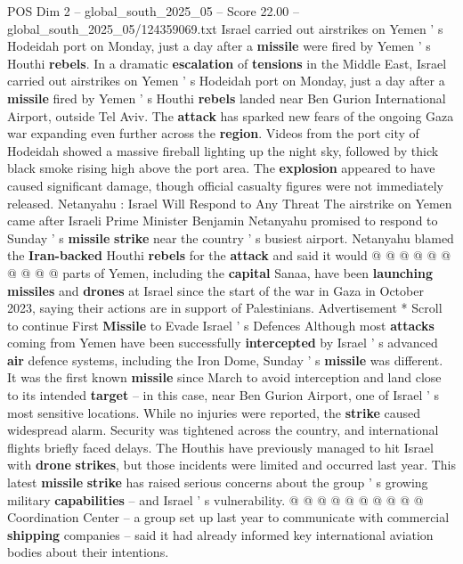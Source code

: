 \begin{textsample}{POS Dim 2 – global\_south\_2025\_05 – Score 22.00 – global\_south\_2025\_05/124359069.txt}  \label{ex:f2_pos_292}
Israel carried out airstrikes on Yemen ' s Hodeidah port on Monday, just a day after a \textbf{missile} were fired by Yemen ' s Houthi \textbf{rebels}.
In a dramatic \textbf{escalation} of \textbf{tensions} in the Middle East, Israel carried out airstrikes on Yemen ' s Hodeidah port on Monday, just a day after a \textbf{missile} fired by Yemen ' s Houthi \textbf{rebels} landed near Ben Gurion International Airport, outside Tel Aviv.
The \textbf{attack} has sparked new fears of the ongoing Gaza war expanding even further across the \textbf{region}.
Videos from the port city of Hodeidah showed a massive fireball lighting up the night sky, followed by thick black smoke rising high above the port area.
The \textbf{explosion} appeared to have caused significant damage, though official casualty figures were not immediately released.
Netanyahu : Israel Will Respond to Any Threat The airstrike on Yemen came after Israeli Prime Minister Benjamin Netanyahu promised to respond to Sunday ' s \textbf{missile} \textbf{strike} near the country ' s busiest airport.
Netanyahu blamed the \textbf{Iran-backed} Houthi \textbf{rebels} for the \textbf{attack} and said it would @ @ @ @ @ @ @ @ @ @ parts of Yemen, including the \textbf{capital} Sanaa, have been \textbf{launching} \textbf{missiles} and \textbf{drones} at Israel since the start of the war in Gaza in October 2023, saying their actions are in support of Palestinians.
Advertisement * Scroll to continue First \textbf{Missile} to Evade Israel ' s Defences Although most \textbf{attacks} coming from Yemen have been successfully \textbf{intercepted} by Israel ' s advanced \textbf{air} defence systems, including the Iron Dome, Sunday ' s \textbf{missile} was different.
It was the first known \textbf{missile} since March to avoid interception and land close to its intended \textbf{target} -- in this case, near Ben Gurion Airport, one of Israel ' s most sensitive locations.
While no injuries were reported, the \textbf{strike} caused widespread alarm.
Security was tightened across the country, and international flights briefly faced delays.
The Houthis have previously managed to hit Israel with \textbf{drone} \textbf{strikes}, but those incidents were limited and occurred last year.
This latest \textbf{missile} \textbf{strike} has raised serious concerns about the group ' s growing military \textbf{capabilities} -- and Israel ' s vulnerability. @ @ @ @ @ @ @ @ @ @ Coordination Center -- a group set up last year to communicate with commercial \textbf{shipping} companies -- said it had already informed key international aviation bodies about their intentions.

\end{textsample}

